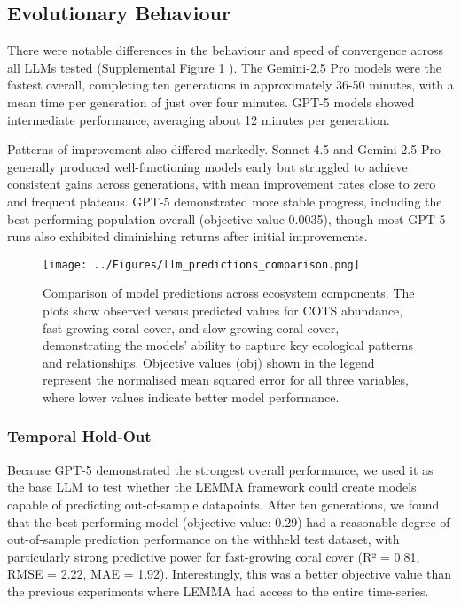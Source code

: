 \subsection{Evolutionary Behaviour}
There were notable differences in the behaviour and speed of convergence across all LLMs tested (Supplemental Figure 1%
). The Gemini-2.5 Pro models were the fastest overall, completing ten generations in approximately 36-50 minutes, with a mean time per generation of just over four minutes. GPT-5 models showed intermediate performance, averaging about 12 minutes per generation.

Patterns of improvement also differed markedly. Sonnet-4.5 and Gemini-2.5 Pro generally produced well-functioning models early but struggled to achieve consistent gains across generations, with mean improvement rates close to zero and frequent plateaus. GPT-5 demonstrated more stable progress, including the best-performing population overall (objective value 0.0035), though most GPT-5 runs also exhibited diminishing returns after initial improvements.

\begin{figure}[H]
    \centering
    \texttt{[image: ../Figures/llm\_predictions\_comparison.png]}
    \caption{Comparison of model predictions across ecosystem components. The plots show observed versus predicted values for COTS abundance, fast-growing coral cover, and slow-growing coral cover, demonstrating the models' ability to capture key ecological patterns and relationships. Objective values (obj) shown in the legend represent the normalised mean squared error for all three variables, where lower values indicate better model performance.}
    \label{fig:llm_comparison}
\end{figure}
    

\subsubsection{Temporal Hold-Out}

Because GPT-5 demonstrated the strongest overall performance, we used it as the base LLM to test whether the LEMMA framework could create models capable of predicting out-of-sample datapoints. After ten generations, we found that the best-performing model (objective value: 0.29) had a reasonable degree of out-of-sample prediction performance on the withheld test dataset, with particularly strong predictive power for fast-growing coral cover (R² = 0.81, RMSE = 2.22, MAE = 1.92). Interestingly, this was a better objective value than the previous experiments where LEMMA had access to the entire time-series.

